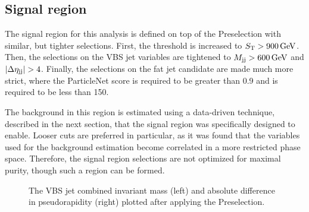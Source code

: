 \subsection{Signal region}
The signal region for this analysis is defined on top of the Preselection with similar, but tighter selections. 
First, the \ST threshold is increased to $S_{\mathrm{T}} > 900\,\text{Ge\hspace{-.08em}V}$. 
Then, the selections on the VBS jet variables are tightened to $M_{\mathrm{j}\mathrm{j}} > 600 \,\text{Ge\hspace{-.08em}V}$ and $|\Delta\eta_{\mathrm{j}\mathrm{j}}| > 4$. 
Finally, the selections on the \Htobb fat jet candidate are made much more strict, where the ParticleNet \Xtobb score is required to be greater than 0.9 and \MSD is required to be less than 150\GeV. 

The background in this region is estimated using a data-driven technique, described in the next section, that the signal region was specifically designed to enable. 
Looser cuts are preferred in particular, as it was found that the variables used for the background estimation become correlated in a more restricted phase space. 
Therefore, the signal region selections are not optimized for maximal purity, though such a region can be formed. 

\begin{figure}[htb]
    \centering
    \qquad
    \caption{
        The VBS jet combined invariant mass (left) and absolute difference in pseudorapidity (right) plotted after applying the Preselection.
    }
    \label{fig:vbswh_presel_vbs}
\end{figure}

